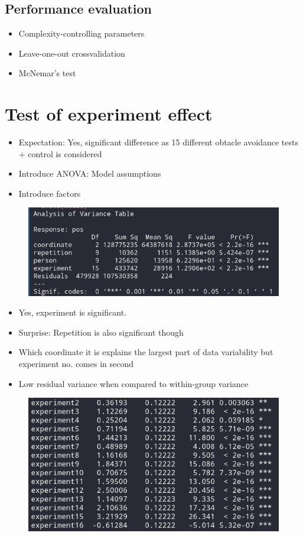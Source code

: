 \documentclass[12pt,fleqn]{article}
\begin{document}
\subsection{Performance evaluation}
\begin{itemize}
	\item Complexity-controlling parameters
	\item Leave-one-out crossvalidation
	\item McNemar's test
\end{itemize}
\section{Test of experiment effect}
\begin{itemize}
	\item Expectation: Yes, significant difference as 15 different obtacle avoidance tests + control is considered
\end{itemize}
\begin{itemize}
	\item Introduce ANOVA: Model assumptions
	\item Introduce factors
\end{itemize}
\begin{figure}[H]
	\centering
	\includegraphics[width=.7\linewidth]{p1_anova}
\end{figure}
\begin{itemize}
	\item Yes, experiment is significant. 
	\item Surprise: Repetition is also significant though
	\item Which coordinate it is explains the largest part of data variability but experiment no. comes in second
	\item Low residual variance when compared to within-group variance
\end{itemize}
\begin{figure}[H]
	\centering
	\includegraphics[width=.7\linewidth]{p1_anova_summay}
\end{figure}
\end{document}

